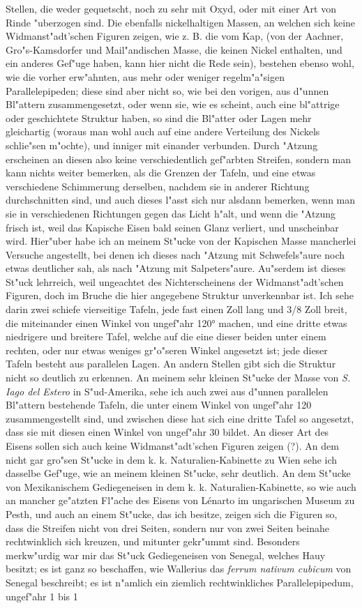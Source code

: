 \documentclass[a4paper, 11pt, oneside, polutonikogreek, german]{article}
\begin{document}
Stellen, die weder gequetscht, noch zu sehr mit Oxyd, oder mit einer Art von Rinde "uberzogen sind. Die ebenfalls nickelhaltigen Massen, an welchen sich keine Widmanst"adt'schen Figuren zeigen, wie z. B. die vom Kap, (von der Aachner, Gro"s-Kamsdorfer und Mail"andischen Masse, die keinen Nickel enthalten, und ein anderes Gef"uge haben, kann hier nicht die Rede sein), bestehen ebenso wohl, wie die vorher erw"ahnten, aus mehr oder weniger regelm"a"sigen Parallelepipeden; diese sind aber nicht so, wie bei den vorigen, aus d"unnen Bl"attern zusammengesetzt, oder wenn sie, wie es scheint, auch eine bl"attrige oder geschichtete Struktur haben, so sind die Bl"atter oder Lagen mehr gleichartig (woraus man wohl auch auf eine andere Verteilung des Nickels schlie"sen m"ochte), und inniger mit einander verbunden. Durch "Atzung erscheinen an diesen also keine verschiedentlich gef"arbten Streifen, sondern man kann nichts weiter bemerken, als die Grenzen der Tafeln, und eine etwas verschiedene Schimmerung derselben, nachdem sie in anderer Richtung durchschnitten sind, und auch dieses l"asst sich nur alsdann bemerken, wenn man sie in verschiedenen Richtungen gegen das Licht h"alt, und wenn die "Atzung frisch ist, weil das Kapische Eisen bald seinen Glanz verliert, und unscheinbar wird. Hier"uber habe ich an meinem St"ucke von der Kapischen Masse mancherlei Versuche angestellt, bei denen ich dieses nach "Atzung mit Schwefels"aure noch etwas deutlicher sah, als nach "Atzung mit Salpeters"aure. Au"serdem ist dieses St"uck lehrreich, weil ungeachtet des Nichterscheinens der Widmanst"adt'schen Figuren, doch im Bruche die hier angegebene Struktur unverkennbar ist. Ich sehe darin zwei schiefe vierseitige Tafeln, jede fast einen Zoll lang und 3/8 Zoll breit, die miteinander einen Winkel von ungef"ahr 120° machen, und eine dritte etwas niedrigere und breitere Tafel, welche auf die eine dieser beiden unter einem rechten, oder nur etwas weniges gr"o"seren Winkel angesetzt ist; jede dieser Tafeln besteht aus parallelen Lagen. An andern Stellen gibt sich die Struktur nicht so deutlich zu erkennen. An meinem sehr kleinen St"ucke der Masse von \emph{S. Iago del Estero} in S"ud-Amerika, sehe ich auch zwei aus d"unnen parallelen Bl"attern bestehende Tafeln, die unter einem Winkel von ungef"ahr 120 zusammengestellt sind, und zwischen diese hat sich eine dritte Tafel so angesetzt, dass sie mit diesen einen Winkel von ungef"ahr 30 bildet. An dieser Art des Eisens sollen sich auch keine Widmanst"adt'schen Figuren zeigen (?). An dem nicht gar gro"sen St"ucke in dem k. k. Naturalien-Kabinette zu Wien sehe ich dasselbe Gef"uge, wie an meinem kleinen St"ucke, sehr deutlich. An dem St"ucke von Mexikanischem Gediegeneisen in dem k. k. Naturalien-Kabinette, so wie auch an mancher ge"atzten Fl"ache des Eisens von Lénarto im ungarischen Museum zu Pesth, und auch an einem St"ucke, das ich besitze, zeigen sich die Figuren so, dass die Streifen nicht von drei Seiten, sondern nur von zwei Seiten beinahe rechtwinklich sich kreuzen, und mitunter gekr"ummt sind. Besonders merkw"urdig war mir das St"uck Gediegeneisen von Senegal, welches Hauy besitzt; es ist ganz so beschaffen, wie Wallerius das \emph{ferrum nativum cubicum} von Senegal beschreibt; es ist n"amlich ein ziemlich rechtwinkliches Parallelepipedum, ungef"ahr 1 bis 1 
\end{document}
